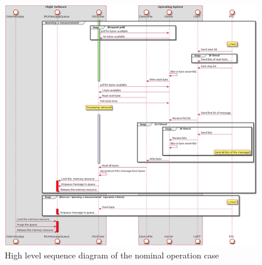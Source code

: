 \begin{figure}[H]
    \centering
    \includegraphics[width=1.0 \textwidth]{diagrams/high_level_sys_overview.png}
    \caption{High level sequence diagram of the nominal operation case}
    \label{fig-high-level-nominal}
\end{figure}

